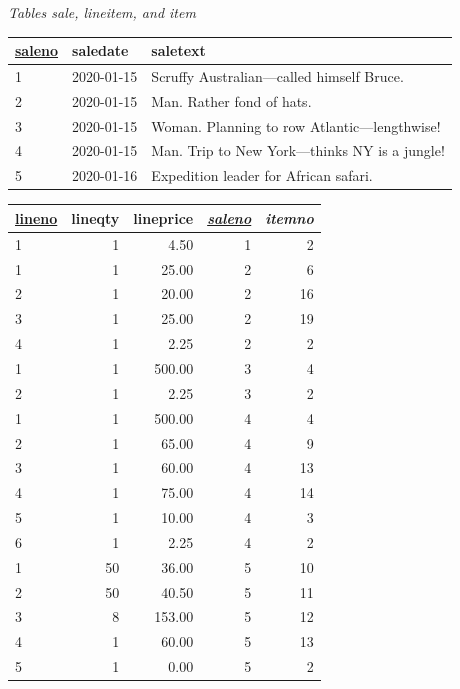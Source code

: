 \documentclass[
]{article}
\begin{document}
\emph{Tables sale, lineitem, and item}

\begin{longtable}[]{@{}lll@{}}
\toprule
\underline{saleno} & saledate & saletext \\
\midrule
\endhead
1 & 2020-01-15 & Scruffy Australian---called himself Bruce. \\
2 & 2020-01-15 & Man. Rather fond of hats. \\
3 & 2020-01-15 & Woman. Planning to row Atlantic---lengthwise! \\
4 & 2020-01-15 & Man. Trip to New York---thinks NY is a jungle! \\
5 & 2020-01-16 & Expedition leader for African safari. \\
\bottomrule
\end{longtable}

\begin{longtable}[]{@{}lrrrr@{}}
\toprule
\underline{lineno} & lineqty & lineprice & \underline{\emph{saleno}} & \emph{itemno} \\
\midrule
\endhead
1 & 1 & 4.50 & 1 & 2 \\
1 & 1 & 25.00 & 2 & 6 \\
2 & 1 & 20.00 & 2 & 16 \\
3 & 1 & 25.00 & 2 & 19 \\
4 & 1 & 2.25 & 2 & 2 \\
1 & 1 & 500.00 & 3 & 4 \\
2 & 1 & 2.25 & 3 & 2 \\
1 & 1 & 500.00 & 4 & 4 \\
2 & 1 & 65.00 & 4 & 9 \\
3 & 1 & 60.00 & 4 & 13 \\
4 & 1 & 75.00 & 4 & 14 \\
5 & 1 & 10.00 & 4 & 3 \\
6 & 1 & 2.25 & 4 & 2 \\
1 & 50 & 36.00 & 5 & 10 \\
2 & 50 & 40.50 & 5 & 11 \\
3 & 8 & 153.00 & 5 & 12 \\
4 & 1 & 60.00 & 5 & 13 \\
5 & 1 & 0.00 & 5 & 2 \\
\bottomrule
\end{longtable}
\end{document}
